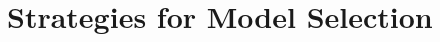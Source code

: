 \begin{comment}
\subsection{The Role of model assumptions}

{\bf XXXXX NOTE THIS IS COMMENTED OUT XXXXXXXXXXXXXXXXXXXXXXXXXXX}

Referees are quick to point out that bivariate normal distributions as
models for home range are simply wrong. As if using wrong models
somehow invalidates something. (is that a statistical paradigm that I
missed?). The issues are whether its an adequate model, whether we can
refute it, whether resulting inferences are sensitive to it, and
whether the model is useful for its intended purpose regardless.
If  we really wanted a great description of a home range then we would do
something different besides conduct an SCR study. The purpose of most
SCR models is not to study home range geometry and morphology but, rather,
to estimate density and possibly other vital rates such as survival and
recruitment. In addition, it is my experience that the same people who
criticize models as implying overly simple models actually cannot describe
alternative models except using jargon and procedures like "kernel
smoothing", "utilization distributions" and "neural networks". So, on
the one hand, the bivariate normal distribution is overly simple, and
therefore we should use "neural networks"?  What irritates me even more
is referees who emphatically assert that "real home ranges aren't bivariate
normal" and then they go on to cite references who somehow "proved" they
are not. These people have no clue what statistics is good for and what
the point of SCR models is, nor can they grasp the relevance of the home
range model - namely, as a model for explaining heterogeneity in
capture-probability. To be sure, the bivariate normal model is an
over-simplification but so far it has not been shown to be ineffective
in SCR problems, and besides  substantially more flexible models have been
developed \citep{royle_etal:2012ecol}.

What we care about in models of capture-recapture data is whether the
bivariate normal (or any model) provides an adequate description of the
encounter process. That is the question we will evaluate here.
\end{comment}


\section{Strategies for Model Selection}

